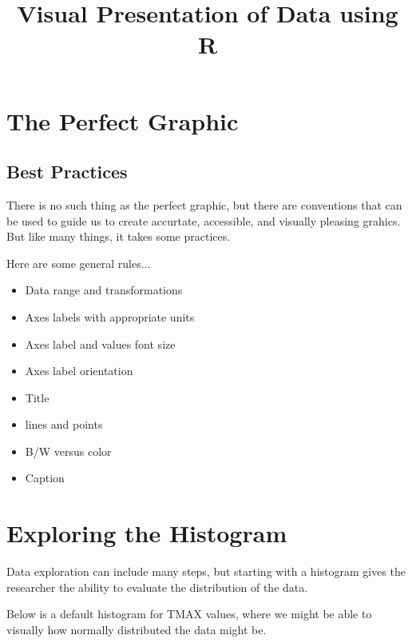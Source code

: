 \documentclass{article}\usepackage[]{graphicx}\usepackage[]{color}
\title{Visual Presentation of Data using R}
\begin{document}
\maketitle

\section{The Perfect Graphic}

\subsection{Best Practices}

There is no such thing as the perfect graphic, but there are conventions that can be used to guide us to create accurtate, accessible, and visually pleasing grahics. But like many things, it takes some practices. 

Here are some general rules...

\begin{itemize}
  \item Data range and transformations
  \item Axes labels with appropriate units
  \item Axes label and values font size
  \item Axes label orientation
  \item Title
  \item lines and points
  \item B/W versus color
  \item Caption
\end{itemize}


\section{Exploring the Histogram}

Data exploration can include many steps, but starting with a histogram gives the researcher the ability to evaluate the distribution of the data.

Below is a default histogram for TMAX values, where we might be able to visually how normally distributed the data might be.
\end{document}
